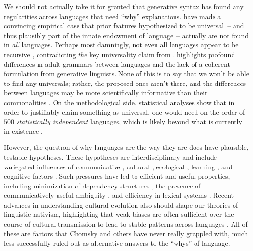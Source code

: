 \documentclass[output=paper,colorlinks,citecolor=brown]{langscibook}
\begin{document}
We should not actually take it for granted that generative syntax has found any regularities across languages that need ``why'' explanations. \citet{evans2009myth} have made a convincing empirical case that prior features hypothesized to be universal~-- and thus plausibly part of the innate endowment of language~-- actually are not found in \textit{all} languages. Perhaps most damningly, not even all languages appear to be recursive \citep{everett2005cultural,futrell2016corpus,pullum2023dan}, contradicting \textit{the} key universality claim from . \citet{dkabrowska2015exactly} highlights profound differences in adult grammars between languages and the lack of a coherent formulation from generative linguists.  None of this is to say that we won't be able to find any universals; rather, the proposed ones aren't there, and the differences between languages may be more scientifically informative than their commonalities \citep{pullum2009universals}. On the methodological side, statistical analyses show that in order to justifiably claim something as universal, one would need on the order of $500$ \textit{statistically independent} languages, which is likely beyond what is currently in existence \citep{piantadosi2014quantitative}. 

However, the question of why languages are the way they are does have plausible, testable hypotheses. These hypotheses are interdisciplinary \citep{reali2009necessity} and include variegated influences of communicative \citep{zipf1965psycho,hockett1959animal,bates1982functionalist,piantadosi2012communicative,gibson2013rational,gibson2019efficiency,coupe2019different,hahn2020universals,futrell2022information}, cultural \citep{everett2005cultural,lupyan2010language,dale2012understanding,everett2015climate}, ecological \citep{lupyan2016there}, learning \citep{smith2012compositionality,steinert2019learnability,steinert2020ease}, and cognitive factors \citep{gibson2000dependency,futrell2015large}. Such pressures have led to efficient and useful properties, including minimization of dependency structures \citep{futrell2015large}, the presence of communicatively useful ambiguity \citep{piantadosi2012communicative}, and efficiency in lexical systems \citep{kemp2012kinship,kemp2018semantic,zaslavsky2019semantic,steinert2020quantifiers,mollica2021forms,mahowald2022efficient,denic2022indefinite}. Recent advances in understanding cultural evolution also should shape our theories of linguistic nativism, highlighting that weak biases are often sufficient over the course of cultural transmission to lead to stable patterns across languages \citep{thompson2016culture,kirby2014iterated,chater2009restrictions}. All of these are factors that Chomsky and others have never really grappled with, much less successfully ruled out as alternative answers to the ``whys'' of language.  
\end{document}
